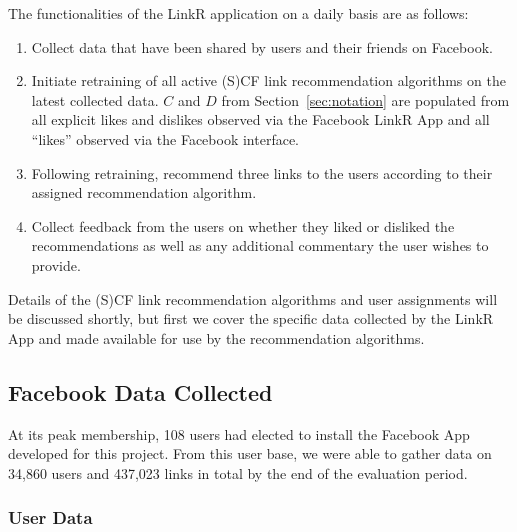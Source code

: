 The functionalities of the LinkR application on a daily basis are as follows:
\begin{enumerate}
\item{Collect data that have been shared by users and their friends on Facebook.}
\item{Initiate retraining of all active (S)CF link recommendation algorithms on the latest collected data.  $C$ and $D$ from Section~\ref{sec:notation}
are populated from 
all explicit likes and dislikes observed via the Facebook LinkR App
and all ``likes'' observed via the Facebook interface.}
\item{Following retraining, recommend three links to the users according to their assigned recommendation algorithm.}
\item{Collect feedback from the users on whether they liked or disliked the recommendations as well as any additional commentary the user wishes to provide.}
\end{enumerate}
Details of the (S)CF link recommendation algorithms and user assignments
will be discussed shortly, but first we cover the specific data
collected by the LinkR App and made available for use by the
recommendation algorithms.

\subsection{Facebook Data Collected}

\label{sec:dataset}

At its peak membership, 108 users had elected to install the Facebook
App developed for this project.  From this user base, we were able to
gather data on 34,860 users and 437,023 links in total by the end of
the evaluation period.

\subsubsection{User Data}

